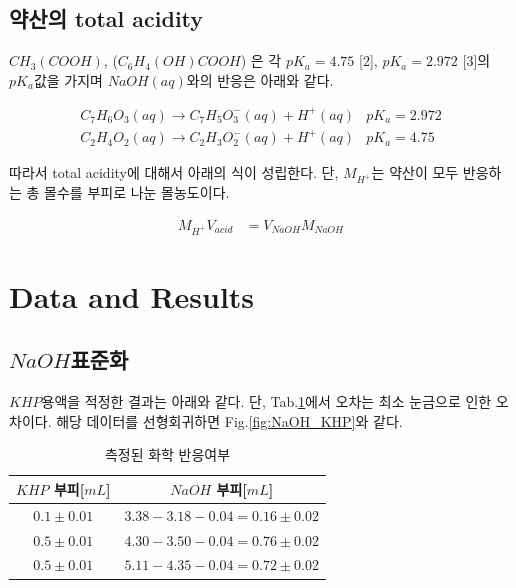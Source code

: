 \documentclass[%
 reprint,
 amsmath,amssymb,
 aps,
]{revtex4-2}
\begin{document}
\subsection{\label{sec:level2}약산의 total acidity}
$CH_{3}(COOH)$, ($C_{6}H_{4}(OH)COOH$) 은 각 $pK_{a}=4.75$ [2], $pK_{a}=2.972$ [3]의 $pK_{a}$값을 가지며 $NaOH(aq)$와의 반응은 아래와 같다.

\begin{align}
	C_{7}H_{6}O_{3}(aq) \rightarrow C_{7}H_{5}O_{3}^{-}(aq) + H^{+}(aq) & pK_{a}=2.972\\
	C_{2}H_{4}O_{2}(aq) \rightarrow C_{2}H_{3}O_{2}^{-}(aq) + H^{+}(aq) & pK_{a}=4.75
\end{align}

따라서 total acidity에 대해서 아래의 식이 성립한다. 단, $M_{H^{+}}$는 약산이 모두 반응하는 총 몰수를 부피로 나눈 몰농도이다.

\begin{align}
	M_{H^{+}}V_{acid} &= V_{NaOH}M_{NaOH} \label{eq:total_acid}
\end{align}

\section{\label{sec:level1}Data and Results}
\subsection{\label{sec:level2}$NaOH$표준화}
$KHP$용액을 적정한 결과는 아래와 같다. 단, Tab.\ref{tab:NaOH_KHP}에서 오차는 최소 눈금으로 인한 오차이다. 해당 데이터를 선형회귀하면 Fig.\ref{fig:NaOH_KHP}와 같다.
\begin{table}[]
\begin{tabular}{c|c} \hline \hline
$KHP$ 부피[$mL$] & $NaOH$ 부피[$mL$] \\ \hline
$0.1\pm0.01$ & $3.38 - 3.18 - 0.04 = 0.16\pm0.02$  \\ \hline
$0.5\pm0.01$ & $4.30 - 3.50 - 0.04 = 0.76\pm0.02$  \\ \hline
$0.5\pm0.01$ & $5.11-4.35 - 0.04 = 0.72\pm0.02$ \\  \hline \hline 
\end{tabular}
\caption{\label{tab:NaOH_KHP}측정된 화학 반응여부}
\end{table}
\end{document}
